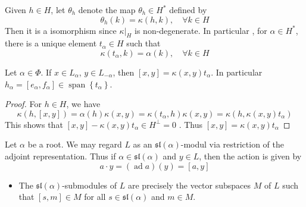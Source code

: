 \documentclass[../main.tex]{subfiles}
\begin{document}
\begin{lemma}{}{}
    Given \(  h \in H  \), let \(   \theta _{h}  \) denote the map \(   \theta _{h}\in H^{*}  \) defined by \[
     \theta _{h}\left( k \right)=  \kappa \left( h,k \right),\quad \forall k \in H  
    \]   
 Then it is a isomorphism since \(   \kappa |_{H}  \) is non-degenerate. 
    In particular , for \(  \alpha \in H^{*}  \), there is a unique element \(  t_{\alpha }\in H  \) such that  \[
     \kappa \left( t_{\alpha },k \right)= \alpha \left( k \right),\quad \forall k\in H  
    \]  
\end{lemma}

\begin{lemma}{}{}
    Let \(  \alpha \in \Phi   \). If \(  x \in L_{\alpha }  \), \(  y\in L_{-\alpha }  \), then \(  \left[ x,y \right]=  \kappa \left( x,y \right)t_{\alpha }    \). In particular \(  h_{\alpha }= \left[ e_{\alpha },f_{\alpha } \right]\in \operatorname{span}\left\{ t_{\alpha } \right\}   \).     
\end{lemma}

\begin{proof}
    For \(  h \in H  \), we have \[
     \kappa \left( h,\left[ x,y \right]  \right)= \alpha \left( h \right) \kappa \left( x,y \right)=  \kappa \left( t_{\alpha },h \right) \kappa \left( x,y \right)  =  \kappa \left( h,  \kappa \left( x,y \right)t_{\alpha }  \right)    
    \] This shows that \(  \left[ x,y \right]- \kappa \left( x,y \right)t_{\alpha } \in H^{\perp}= 0    \) . Thus \(  \left[ x,y \right]=  \kappa \left( x,y \right)t_{\alpha }    \) 
\end{proof}

\begin{definition}{}{}
    Let \(  \alpha   \) be a root. We may regard \(  L  \) as an \(  \mathfrak{sl}\left(  \alpha  \right)   \)-modul via restriction of the adjoint representation. Thus if \(  \alpha \in \mathfrak{sl}\left( \alpha  \right)   \) and \(  y \in L  \), then the action is given by \[
    a\cdot y= \left( \operatorname{ad}a \right)\left( y \right)= \left[ a,y \right]   
    \]     
\end{definition}

\begin{remark}
    \begin{itemize}
        \item The \(  \mathfrak{sl}\left(  \alpha  \right)   \)-submodules of \(  L  \) are precisely the vector subspaces \(  M  \) of \(  L  \) such that \(  [s,m]\in M  \) for all \(  s \in \mathfrak{sl}\left( \alpha  \right)   \) and \(  m \in M  \).       
    \end{itemize}
    
\end{remark}
\end{document}
